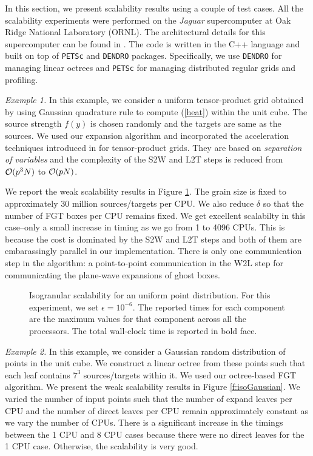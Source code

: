 
In this section, we present scalability results using a couple of test cases.  All the scalability experiments were performed 
on the {\it{Jaguar}} supercomputer at Oak Ridge National Laboratory (ORNL). The architectural details for this supercomputer
 can be found in \cite{jaguar}. The code is written in the C++ language and built on top of \texttt{PETSc} and \texttt{DENDRO} packages. 
 Specifically, we use \texttt{DENDRO} for managing linear octrees and \texttt{PETSc} for managing distributed regular grids and profiling. 

{\em Example 1.} In this example, we consider a uniform tensor-product grid obtained by using Gaussian quadrature rule to
 compute (\ref{heat}) within the unit cube. The source strength $f(y)$ is chosen randomly and the targets are same as the
  sources. We used our expansion algorithm and incorporated the acceleration techniques
  introduced in \cite{fggt} for tensor-product grids. They are based on {\em separation of variables} and
  the complexity of the S2W and L2T steps is reduced from $\mathcal{O}(p^3 N)$ to $\mathcal{O}(p N)$. 

We report the weak scalability results in Figure \ref{f:isoUniform}. The grain size is fixed to approximately 30 million 
sources/targets per CPU. We also reduce $\delta$ so that the number of FGT boxes per CPU remains fixed. We get excellent
 scalabilty in this case--only a small increase in timing as we go from 1 to 4096 CPUs. This is  because the cost is dominated 
 by the S2W and L2T steps and both of them are embarassingly parallel in our implementation. There is only one communication 
 step in the algorithm: a point-to-point communication in the W2L step for communicating the plane-wave expansions of ghost boxes.

\begin{figure}
	\begin{center}
	
	\end{center}
\caption{\label{f:isoUniform} Isogranular scalability for an uniform point distribution. For
 this experiment, we set $\epsilon = 10^{-6}$. The reported times for 
each component are the maximum values for that component across all the processors. The total wall-clock
time is reported in bold face.} 
\end{figure}

{\em Example 2.} In this example, we consider a Gaussian random distribution of points in the unit cube. We construct
a linear octree from these points such that each leaf contains $7^3$ sources/targets within it. We used 
 our octree-based FGT algorithm. We present the weak scalability results in Figure \ref{f:isoGaussian}. We varied the
 number of input points such that the number of expand leaves per CPU and the number of direct leaves per CPU remain
  approximately constant as we vary the number of CPUs. There is a significant increase in the timings between the 
  1 CPU and 8 CPU cases because there were no direct leaves for the 1 CPU case. Otherwise, the scalability is very good.

